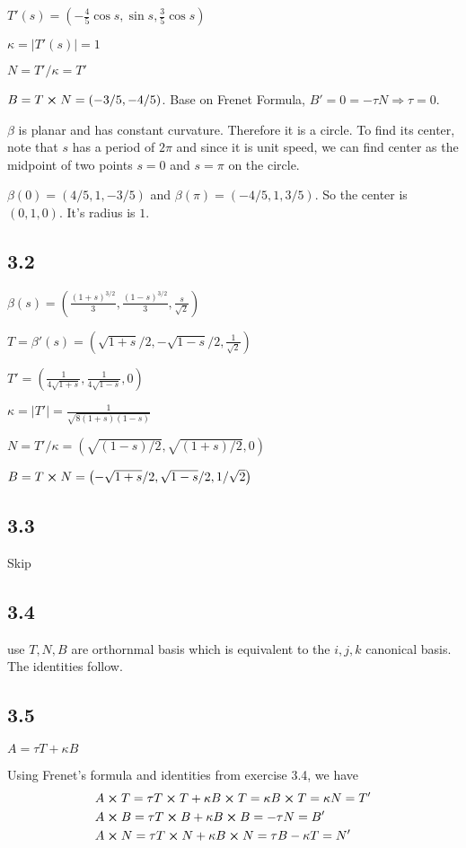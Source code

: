 \documentclass[12pt]{article}
\begin{document}
$T'(s) = (-\frac{4}{5}\cos s, \sin s, \frac{3}{5} \cos s)$

$\kappa = |T'(s)| = 1$

$N = T' / \kappa = T'$

$B = T \cross N = (-3/5, -4/5)$. Base on Frenet Formula, $B' = 0 = -\tau N \Rightarrow \tau = 0$.

$\beta$ is planar and has constant curvature. Therefore it is a circle. To find its center, note that $s$ has a period of $2\pi$ and since it is unit speed, we can find center as the midpoint of two points $s=0$ and $s=\pi$ on the circle. 

 $\beta(0) = (4/5, 1, -3/5)$ and  $\beta(\pi) = (-4/5, 1, 3/5)$. So the center is $(0, 1, 0)$. It's radius is $1$.

\subsection*{3.2}
$\beta(s) = \left(\frac{(1+s)^{3/2}}{3}, \frac{(1-s)^{3/2}}{3}, \frac{s}{\sqrt{2}}  \right)$

$T=\beta'(s) =(\sqrt{1+s}/2, -\sqrt{1 - s}/ 2, \frac{1}{\sqrt{2}})$

$T' = (\frac{1}{4\sqrt{1+s}}, \frac{1}{4\sqrt{1-s}}, 0)$

$\kappa = |T'| = \frac{1}{\sqrt{8(1+s)(1-s)}} $

$N = T'/\kappa = \left(\sqrt{(1-s)/ 2}, \sqrt{(1+s)/2}, 0 \right)$

$B = T \cross N = \left(-\sqrt{1+s}/2, \sqrt{1-s}/2, 1/\sqrt{2} \right)$

\subsection*{3.3}
Skip

\subsection*{3.4}
use $T, N, B$ are orthornmal basis which is equivalent to the $i, j, k$ canonical basis. The identities follow.

\subsection*{3.5}
$A = \tau T + \kappa B$

Using Frenet's formula and identities from exercise 3.4, we have
$$
\begin{aligned}
	&A \cross T = \tau T\cross T + \kappa B \cross T =  \kappa B \cross T = \kappa N = T' \\ 
	&A \cross B = \tau T \cross B + \kappa B \cross B = -\tau N = B' \\
	&A \cross N = \tau T \cross N + \kappa B \cross N = \tau B - \kappa T = N'
\end{aligned}
$$
\end{document}
